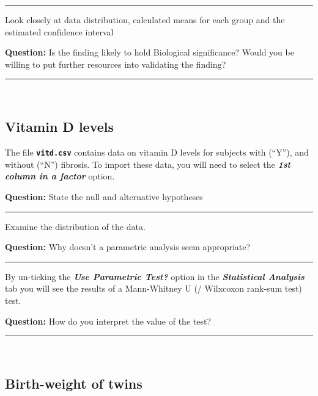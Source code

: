 \documentclass[]{article}
\begin{document}
\begin{center}\rule{0.5\linewidth}{\linethickness}\end{center}

Look closely at data distribution, calculated means for each group and
the estimated confidence interval

{\textbf{Question:}} Is the finding likely to hold Biological
significance? Would you be willing to put further resources into
validating the finding?

\begin{center}\rule{0.5\linewidth}{\linethickness}\end{center}

~

\hypertarget{vitamin-d-levels}{%
\subsection{Vitamin D levels}\label{vitamin-d-levels}}

The file \textbf{\texttt{vitd.csv}} contains data on vitamin D levels
for subjects with (``Y''), and without (``N'') fibrosis. To import these
data, you will need to select the \textbf{\emph{1st column in a factor}}
option.

{\textbf{Question:}} State the null and alternative hypotheses

\begin{center}\rule{0.5\linewidth}{\linethickness}\end{center}

Examine the distribution of the data.

{\textbf{Question:}} Why doesn't a parametric analysis seem appropriate?

\begin{center}\rule{0.5\linewidth}{\linethickness}\end{center}

By un-ticking the \textbf{\emph{Use Parametric Test?}} option in the
\textbf{\emph{Statistical Analysis}} tab you will see the results of a
Mann-Whitney U (/ Wilxcoxon rank-sum test) test.

{\textbf{Question:}} How do you interpret the value of the test?

\begin{center}\rule{0.5\linewidth}{\linethickness}\end{center}

~

\hypertarget{birth-weight-of-twins}{%
\subsection{Birth-weight of twins}\label{birth-weight-of-twins}}
\end{document}
